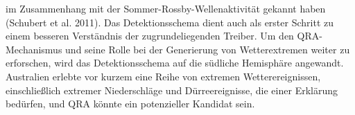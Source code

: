 im Zusammenhang mit der Sommer-Rossby-Wellenaktivität gekannt haben (Schubert et al. 2011). Das Detektionsschema dient auch als erster Schritt zu einem besseren Verständnis der zugrundeliegenden Treiber. Um den QRA-Mechanismus und seine Rolle bei der Generierung von Wetterextremen weiter zu erforschen, wird das Detektionsschema auf die südliche Hemisphäre angewandt. Australien erlebte vor kurzem eine Reihe von extremen Wetterereignissen, einschließlich extremer Niederschläge und Dürreereignisse, die einer Erklärung bedürfen, und QRA könnte ein potenzieller Kandidat sein.

